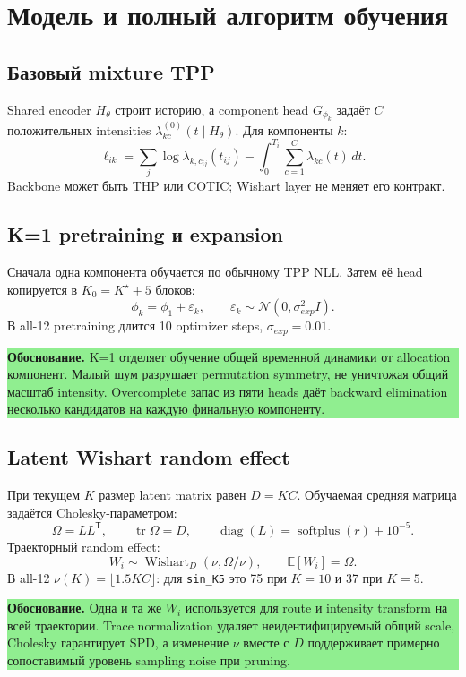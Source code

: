 \documentclass[11pt,a4paper]{article}
\newcommand{\code}[1]{\texttt{#1}}
\newcommand{\Ktarget}{K^{\star}}
\newcommand{\boxnote}[2]{%
  \begin{center}\setlength{\fboxsep}{9pt}%
  \colorbox{#1}{\begin{minipage}{0.94\textwidth}\raggedright #2\par\end{minipage}}
  \end{center}}
\newcommand{\rationale}[1]{\boxnote{lightgreen}{\textbf{Обоснование.} #1}}
\begin{document}
\section{Модель и полный алгоритм обучения}

\subsection{Базовый mixture TPP}

Shared encoder $H_{\theta}$ строит историю, а component head $G_{\phi_k}$
задаёт $C$ положительных intensities $\lambda_{kc}^{(0)}(t\mid H_{\theta})$.
Для компоненты $k$:
\[
\ell_{ik}=\sum_j\log\lambda_{k,c_{ij}}(t_{ij})-
\int_0^{T_i}\sum_{c=1}^{C}\lambda_{kc}(t)\,dt.
\]
Backbone может быть THP или COTIC; Wishart layer не меняет его контракт.

\subsection{K=1 pretraining и expansion}

Сначала одна компонента обучается по обычному TPP NLL. Затем её head копируется
в $K_0=\Ktarget+5$ блоков:
\[
\phi_k=\phi_1+\varepsilon_k,\qquad
\varepsilon_k\sim\mathcal N(0,\sigma_{exp}^2I).
\]
В all-12 pretraining длится 10 optimizer steps, $\sigma_{exp}=0.01$.

\rationale{K=1 отделяет обучение общей временной динамики от allocation
компонент. Малый шум разрушает permutation symmetry, не уничтожая общий
масштаб intensity. Overcomplete запас из пяти heads даёт backward elimination
несколько кандидатов на каждую финальную компоненту.}

\subsection{Latent Wishart random effect}

При текущем $K$ размер latent matrix равен $D=KC$. Обучаемая средняя матрица
задаётся Cholesky-параметром:
\[
\Omega=LL^{\mathsf T},\qquad \operatorname{tr}\Omega=D,
\qquad \operatorname{diag}(L)=\operatorname{softplus}(r)+10^{-5}.
\]
Траекторный random effect:
\[
W_i\sim\operatorname{Wishart}_{D}(\nu,\Omega/\nu),
\qquad \mathbb E[W_i]=\Omega.
\]
В all-12 $\nu(K)=\lfloor1.5KC\rfloor$: для \code{sin\_K5} это 75 при
$K=10$ и 37 при $K=5$.

\rationale{Одна и та же $W_i$ используется для route и intensity transform на
всей траектории. Trace normalization удаляет неидентифицируемый общий scale,
Cholesky гарантирует SPD, а изменение $\nu$ вместе с $D$ поддерживает примерно
сопоставимый уровень sampling noise при pruning.}
\end{document}
